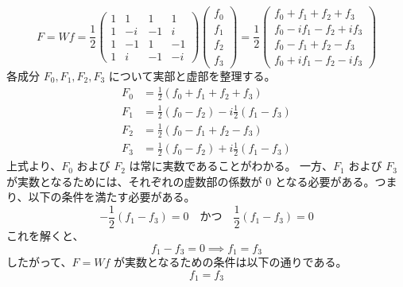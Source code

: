 \documentclass[11pt,a4paper]{jlreq}
\begin{document}
\begin{enumerate}
    \[
        F = Wf = \frac{1}{2} \begin{pmatrix} 1 & 1 & 1 & 1 \\ 1 & -i & -1 & i \\ 1 & -1 & 1 & -1 \\ 1 & i & -1 & -i \end{pmatrix} \begin{pmatrix} f_0 \\ f_1 \\ f_2 \\ f_3 \end{pmatrix}
        = \frac{1}{2} \begin{pmatrix} f_0 + f_1 + f_2 + f_3 \\ f_0 - i f_1 - f_2 + i f_3 \\ f_0 - f_1 + f_2 - f_3 \\ f_0 + i f_1 - f_2 - i f_3 \end{pmatrix}
    \]
    \noindent
    各成分 $F_0, F_1, F_2, F_3$ について実部と虚部を整理する。
    \begin{align*}
        F_0 &= \frac{1}{2}(f_0 + f_1 + f_2 + f_3) \\
        F_1 &= \frac{1}{2}(f_0 - f_2) - i \frac{1}{2}(f_1 - f_3) \\
        F_2 &= \frac{1}{2}(f_0 - f_1 + f_2 - f_3) \\
        F_3 &= \frac{1}{2}(f_0 - f_2) + i \frac{1}{2}(f_1 - f_3)
    \end{align*}
    上式より、$F_0$ および $F_2$ は常に実数であることがわかる。
    一方、$F_1$ および $F_3$ が実数となるためには、それぞれの虚数部の係数が $0$ となる必要がある。つまり、以下の条件を満たす必要がある。
    \[
        -\frac{1}{2}(f_1 - f_3) = 0 \quad \text{かつ} \quad \frac{1}{2}(f_1 - f_3) = 0
    \]
    これを解くと、
    \[
        f_1 - f_3 = 0 \implies f_1 = f_3
    \]
    したがって、$F = Wf$ が実数となるための条件は以下の通りである。
    \[
        \boxed{ f_1 = f_3 }
    \]


\end{enumerate}
\end{document}
